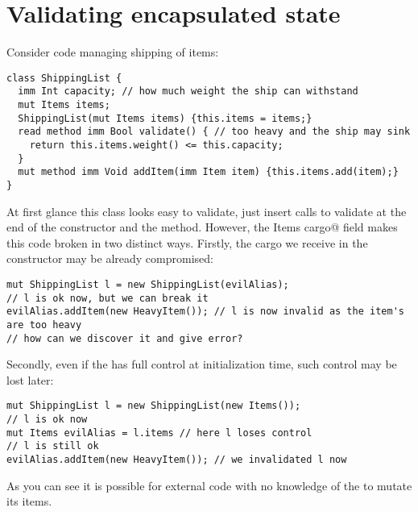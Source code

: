 \saveSpace
\section{Validating encapsulated state}
\label{s:encapsulated}
\saveSpace




Consider code managing shipping of items:
\saveSpace
\begin{lstlisting}
class ShippingList {
  imm Int capacity; // how much weight the ship can withstand
  mut Items items;
  ShippingList(mut Items items) {this.items = items;}
  read method imm Bool validate() {	// too heavy and the ship may sink
    return this.items.weight() <= this.capacity;
  }
  mut method imm Void addItem(imm Item item) {this.items.add(item);}
}
\end{lstlisting}
\saveSpace
At first glance this class looks easy to validate, just insert calls to validate at the end of the constructor and the \Q@addItem@ method.
However, the \Q@mut Items cargo@ field makes this code broken in two distinct ways.
Firstly, the cargo we receive in the constructor may be already compromised:
\saveSpace
\begin{lstlisting}
mut ShippingList l = new ShippingList(evilAlias);
// l is ok now, but we can break it
evilAlias.addItem(new HeavyItem()); // l is now invalid as the item's are too heavy
// how can we discover it and give error?
\end{lstlisting}
\saveSpace 
Secondly, even if the \Q@ShippingList@ has full control at initialization time, such control may be lost later:
\saveSpace
\begin{lstlisting}
mut ShippingList l = new ShippingList(new Items());
// l is ok now
mut Items evilAlias = l.items // here l loses control
// l is still ok
evilAlias.addItem(new HeavyItem()); // we invalidated l now
\end{lstlisting}
\saveSpace
As you can see it is possible for external code with no knowledge of the \Q@ShippingList@ to mutate its items.

